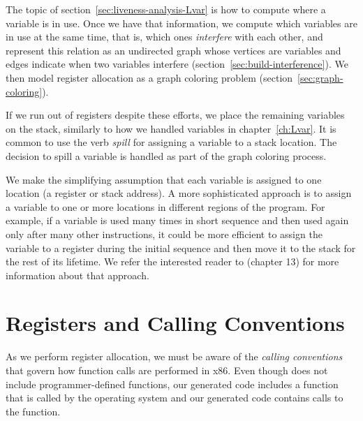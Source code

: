 \documentclass[7x10]{TimesAPriori_MIT}%
\numberwithin{theorem}{chapter}
\numberwithin{definition}{chapter}
\numberwithin{equation}{chapter}
\begin{document}
The topic of section~\ref{sec:liveness-analysis-Lvar} is how to
compute where a variable is in use.  Once we have that information, we
compute which variables are in use at the same time, that is, which ones
\emph{interfere} with each other, and
represent this relation as an undirected graph whose vertices are
variables and edges indicate when two variables interfere
(section~\ref{sec:build-interference}). We then model register
allocation as a graph coloring problem
(section~\ref{sec:graph-coloring}).

If we run out of registers despite these efforts, we place the
remaining variables on the stack, similarly to how we handled
variables in chapter~\ref{ch:Lvar}. It is common to use the verb
\emph{spill} for assigning a variable to a stack
location. The decision to spill a variable is handled as part of the
graph coloring process.

We make the simplifying assumption that each variable is assigned to
one location (a register or stack address). A more sophisticated
approach is to assign a variable to one or more locations in different
regions of the program.  For example, if a variable is used many times
in short sequence and then used again only after many other
instructions, it could be more efficient to assign the variable to a
register during the initial sequence and then move it to the stack for
the rest of its lifetime. We refer the interested reader to
\citet{Cooper:2011aa} (chapter 13) for more information about that
approach.


\section{Registers and Calling Conventions}
\label{sec:calling-conventions}

As we perform register allocation, we must be aware of the
\emph{calling conventions}  that
govern how function calls are performed in x86.
%
Even though \LangVar{} does not include programmer-defined functions,
our generated code includes a  function that is called by
the operating system and our generated code contains calls to the
 function.
\end{document}
